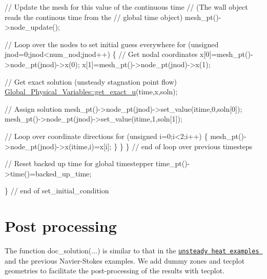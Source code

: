 \begin{DoxyCodeInclude}
   \textcolor{comment}{// Update the mesh for this value of the continuous time}
   \textcolor{comment}{// (The wall object reads the continous time from the }
   \textcolor{comment}{// global time object)}
   mesh\_pt()->node\_update(); 
   
   \textcolor{comment}{// Loop over the nodes to set initial guess everywhere}
   \textcolor{keywordflow}{for} (\textcolor{keywordtype}{unsigned} jnod=0;jnod<num\_nod;jnod++)
    \{
     \textcolor{comment}{// Get nodal coordinates}
     x[0]=mesh\_pt()->node\_pt(jnod)->x(0);
     x[1]=mesh\_pt()->node\_pt(jnod)->x(1);
     
     \textcolor{comment}{// Get exact solution (unsteady stagnation point flow)}
     \hyperlink{namespaceGlobal__Physical__Variables_af29d0fbf7264555610176a1fc931591a}{Global\_Physical\_Variables::get\_exact\_u}(time,x,soln);
     
     \textcolor{comment}{// Assign solution}
     mesh\_pt()->node\_pt(jnod)->set\_value(itime,0,soln[0]);
     mesh\_pt()->node\_pt(jnod)->set\_value(itime,1,soln[1]);
       
     \textcolor{comment}{// Loop over coordinate directions}
     \textcolor{keywordflow}{for} (\textcolor{keywordtype}{unsigned} i=0;i<2;i++)
      \{
       mesh\_pt()->node\_pt(jnod)->x(itime,i)=x[i];
      \}
    \} 
  \} \textcolor{comment}{// end of loop over previous timesteps}
 
 \textcolor{comment}{// Reset backed up time for global timestepper}
 time\_pt()->time()=backed\_up\_time;
 
\} \textcolor{comment}{// end of set\_initial\_condition}

\end{DoxyCodeInclude}




 

\hypertarget{index_doc}{}\section{Post processing}\label{index_doc}
The function {\ttfamily doc\+\_\+solution}(...) is similar to that in the \href{../../../unsteady_heat/two_d_unsteady_heat/html/index.html#doc}{\tt unsteady heat examples } and the previous Navier-\/\+Stokes examples. We add dummy zones and tecplot geometries to facilitate the post-\/processing of the results with tecplot.


